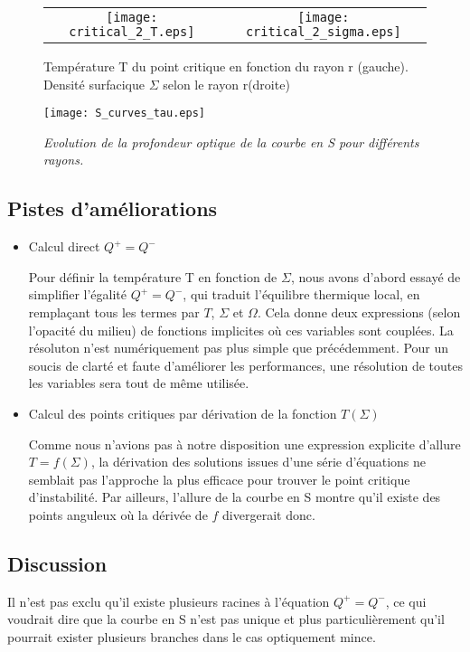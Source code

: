 \begin{figure}[htb!]
\centering
\begin{tabular}{cc} 
\texttt{[image: critical\_2\_T.eps]} &
\texttt{[image: critical\_2\_sigma.eps]} \\
\end{tabular}
  \caption{Température T du point critique en fonction du rayon r (gauche). Densité surfacique $\Sigma$ selon le rayon r(droite)}
\label{Fig::fctR}
\end{figure}
  

\begin{figure}[htb!]
	\centering
	\texttt{[image: S\_curves\_tau.eps]}
	\caption{\textit{Evolution de la profondeur optique de la courbe en S pour différents rayons.}  }
	\label{Fig::3}
\end{figure}

\subsection{Pistes d'améliorations}

\begin{itemize}

\item Calcul direct $Q^+ = Q^-$

Pour définir la température T en fonction de $\Sigma$, nous avons d'abord essayé de simplifier l'égalité $Q^+ = Q^-$, qui traduit l'équilibre thermique local, en remplaçant tous les termes par $T$, $\Sigma$ et $\Omega$. Cela donne deux expressions (selon l'opacité du milieu) de fonctions implicites où ces variables sont couplées.
La résoluton n'est numériquement pas plus simple que précédemment. Pour un soucis de clarté et faute d'améliorer les performances, une résolution de toutes les variables sera tout de même utilisée.
\item Calcul des points critiques par dérivation de la fonction $T(\Sigma)$

Comme nous n'avions pas à notre disposition une expression explicite d'allure $T = f(\Sigma)$, la dérivation des solutions issues d'une série d'équations ne semblait pas l'approche la plus efficace pour trouver le point critique d'instabilité. Par ailleurs, l'allure de la courbe en S montre qu'il existe des points anguleux où la dérivée de $f$ divergerait donc.
\end{itemize}

\subsection{Discussion}
Il n'est pas exclu qu'il existe plusieurs racines à l'équation $Q^+ = Q^-$, ce qui voudrait dire que la courbe en S n'est pas unique et plus particulièrement qu'il pourrait exister plusieurs branches dans le cas optiquement mince. 


